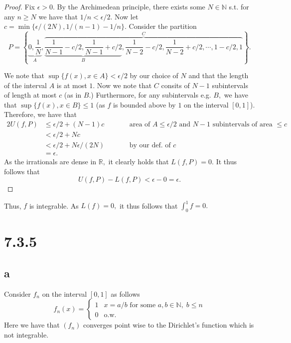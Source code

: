 \documentclass[10pt]{article}
\begin{document}
\begin{proof}
    Fix $\epsilon>0.$ By the Archimedean principle, there exists some $N\in\mathbb{N}$ s.t. for any $n\ge N$ we have that $1/n < \epsilon/2.$ Now let $c = \min\{\epsilon/(2N), 1/(n-1)-1/n\}.$ Consider the partition 
    \begin{equation*}
        P=\left \{\underbrace{0,\frac{1}{N}}_{A}, \overbrace{\underbrace{\frac{1}{N-1}-c/2, \frac{1}{N-1}+c/2}_{B},  \frac{1}{N-2}-c/2, \frac{1}{N-2}+c/2,\cdots, 1-c/2, 1}^{C}\right \}.
    \end{equation*}
    
    We note that $\sup\{f(x), x\in A\}< \epsilon/2$ by our choice of $N$ and that the length of the interval $A$ is at most $1$. Now we note that $C$ consits of $N-1$ subintervals of length at most $c$ (as in $B$.) Furthermore, for any subintervals e.g. $B,$ we have that $\sup\{f(x), x\in B\}\le 1$ (as $f$ is bounded above by $1$ on the interval $[0,1]$). Therefore, we have that
    \begin{alignat*}{2}
        U(f,P) &\le \epsilon/2 + (N-1)c \qquad&&\text{area of $A \le \epsilon/2$ and $N-1$ subintervals of area $\le c$}\\
        &< \epsilon/2 + Nc\\
        &< \epsilon/2 + N\epsilon/(2N) &&\text{by our def. of $c$}\\
        &= \epsilon.
    \end{alignat*}
    As the irrationals are dense in $\mathbb{R},$ it clearly holds that $L(f,P)=0.$ It thus follows that
    \begin{equation*}
        U(f,P)-L(f,P)<\epsilon-0 = \epsilon.
    \end{equation*}
\end{proof}

Thus, $f$ is integrable. As $L(f)=0,$ it thus follows that $\int_{0}^{1}f = 0.$

\section*{7.3.5}
\subsection*{a}
Consider $f_n$ on the interval $[0,1]$ as follows
\begin{equation*}
    f_n(x)=\begin{cases}
        1 & x = a/b \text{ for some } a,b\in\mathbb{N},\; b\le n\\
        0 & \text{o.w.}
    \end{cases}
\end{equation*}
Here we have that $(f_n)$ converges point wise to the Dirichlet's function which is not integrable.
\end{document}
